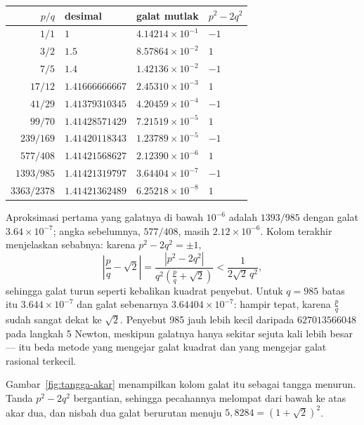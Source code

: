 \begin{center}\small
\begin{tabular}{rlll}
\hline
$p/q$ & desimal & galat mutlak & $p^2-2q^2$ \\
\hline
$1/1$ & $1$ & $4.14214\times10^{-1}$ & $-1$ \\
$3/2$ & $1.5$ & $8.57864\times10^{-2}$ & $1$ \\
$7/5$ & $1.4$ & $1.42136\times10^{-2}$ & $-1$ \\
$17/12$ & $1.41666666667$ & $2.45310\times10^{-3}$ & $1$ \\
$41/29$ & $1.41379310345$ & $4.20459\times10^{-4}$ & $-1$ \\
$99/70$ & $1.41428571429$ & $7.21519\times10^{-5}$ & $1$ \\
$239/169$ & $1.41420118343$ & $1.23789\times10^{-5}$ & $-1$ \\
$577/408$ & $1.41421568627$ & $2.12390\times10^{-6}$ & $1$ \\
$1393/985$ & $1.41421319797$ & $3.64404\times10^{-7}$ & $-1$ \\
$3363/2378$ & $1.41421362489$ & $6.25218\times10^{-8}$ & $1$ \\
\hline
\end{tabular}
\end{center}

Aproksimasi pertama yang galatnya di bawah $10^{-6}$ adalah $1393/985$ dengan galat
$3.64\times10^{-7}$; angka sebelumnya, $577/408$, masih $2.12\times10^{-6}$. Kolom
terakhir menjelaskan sebabnya: karena $p^2-2q^2=\pm1$,
\[
\left|\frac pq-\sqrt2\right|
=\frac{|p^2-2q^2|}{q^2\left(\frac pq+\sqrt2\right)}
<\frac{1}{2\sqrt2\,q^2},
\]
sehingga galat turun seperti kebalikan kuadrat penyebut. Untuk $q=985$ batas itu
$3.644\times10^{-7}$ dan galat sebenarnya $3.64404\times10^{-7}$: hampir tepat, karena
$\frac pq$ sudah sangat dekat ke $\sqrt2$. Penyebut 985 jauh lebih kecil daripada
$627013566048$ pada langkah 5 Newton, meskipun galatnya hanya sekitar sejuta kali lebih
besar --- itu beda metode yang mengejar galat kuadrat dan yang mengejar galat rasional
terkecil.

Gambar~\ref{fig:tangga-akar} menampilkan kolom galat itu sebagai tangga menurun. Tanda
$p^2-2q^2$ bergantian, sehingga pecahannya melompat dari bawah ke atas akar dua, dan
nisbah dua galat berurutan menuju $5{,}8284=(1+\sqrt2)^2$.

